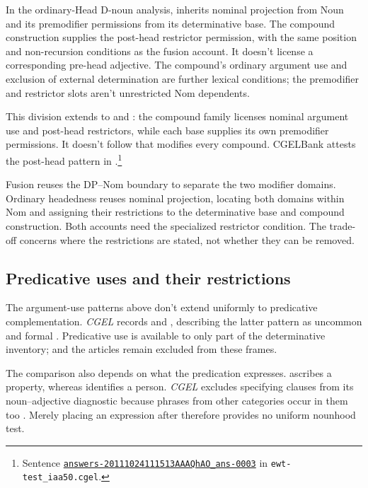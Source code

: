 \documentclass[12pt]{article}
\begin{document}
In the ordinary-Head D-noun analysis,  inherits nominal projection from Noun and its premodifier permissions from its determinative base. The compound construction supplies the post-head restrictor permission, with the same position and non-recursion conditions as the fusion account. It doesn't license a corresponding pre-head adjective. The compound's ordinary argument use and exclusion of external determination are further lexical conditions; the premodifier and restrictor slots aren't unrestricted Nom dependents.

This division extends to  and : the compound family licenses nominal argument use and post-head restrictors, while each base supplies its own premodifier permissions. It doesn't follow that  modifies every compound. CGELBank attests the post-head pattern in .\footnote{Sentence \href{https://github.com/nert-nlp/cgel/blob/d0a2c2d8c522b23d5aa879fc9cb94948f4285b2c/datasets/ewt-test_iaa50.cgel\#L179-L181}{\nolinkurl{answers-20111024111513AAAQhAO_ans-0003}} in \nolinkurl{ewt-test_iaa50.cgel}.}

Fusion reuses the DP--Nom boundary to separate the two modifier domains. Ordinary headedness reuses nominal projection, locating both domains within Nom and assigning their restrictions to the determinative base and compound construction. Both accounts need the specialized restrictor condition. The trade-off concerns where the restrictions are stated, not whether they can be removed.

\subsection{Predicative uses and their restrictions}\label{sec:predication}

The argument-use patterns above don't extend uniformly to predicative complementation. \textit{CGEL} records  and , describing the latter pattern as uncommon and formal \citep[392, 395--396]{huddleston2002}. Predicative use is available to only part of the determinative inventory;  and the articles remain excluded from these frames.

The comparison also depends on what the predication expresses.  ascribes a property, whereas  identifies a person. \textit{CGEL} excludes specifying  clauses from its noun--adjective diagnostic because phrases from other categories occur in them too \citep[536]{huddleston2002}. Merely placing an expression after  therefore provides no uniform nounhood test.
\end{document}
